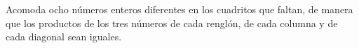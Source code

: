 Acomoda ocho números enteros diferentes en los cuadritos que faltan, de manera que los productos de los tres números de cada renglón, de cada columna y de cada diagonal sean iguales.